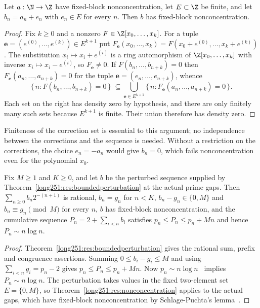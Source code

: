\begin{theorem}\label{long251:res:nonconcentration}
Let $a:\N\to\Z$ have fixed-block nonconcentration, let $E\subset\Z$ be finite,
and let $b_n=a_n+e_n$ with $e_n\in E$ for every $n$.  Then $b$ has fixed-block
nonconcentration.
\end{theorem}

\begin{proof}
Fix $k\ge0$ and a nonzero $F\in\Z[x_0,\ldots,x_k]$.  For a tuple
$\mathbf e=(e^{(0)},\ldots,e^{(k)})\in E^{k+1}$ put
$F_{\mathbf e}(x_0,\ldots,x_k)=F(x_0+e^{(0)},\ldots,x_k+e^{(k)})$.  The
substitution $x_i\mapsto x_i+e^{(i)}$ is a ring automorphism of
$\Z[x_0,\ldots,x_k]$ with inverse $x_i\mapsto x_i-e^{(i)}$, so
$F_{\mathbf e}\ne0$.  If $F(b_n,\ldots,b_{n+k})=0$ then
$F_{\mathbf e}(a_n,\ldots,a_{n+k})=0$ for the tuple
$\mathbf e=(e_n,\ldots,e_{n+k})$, whence
\[
 \{\,n:F(b_n,\ldots,b_{n+k})=0\,\}
 \;\subseteq\!\!
 \bigcup_{\mathbf e\in E^{k+1}}\!\!
 \{\,n:F_{\mathbf e}(a_n,\ldots,a_{n+k})=0\,\}.
\]
Each set on the right has density zero by hypothesis, and there are
only finitely many such sets because $E^{k+1}$ is finite.  Their union
therefore has density zero.
\end{proof}

Finiteness of the correction set is essential to this argument; no
independence between the corrections and the sequence is needed.
Without a restriction on the corrections, the choice $e_n=-a_n$ would
give $b_n=0$, which fails nonconcentration even for the polynomial $x_0$.

\begin{corollary}\label{long251:res:nonconc-primes}
Fix $M\ge1$ and $K\ge0$, and let $b$ be the perturbed sequence supplied by
Theorem~\ref{long251:res:boundedperturbation} at the actual prime gaps.  Then
$\sum_{n\ge0}b_n2^{-(n+1)}$ is rational, $b_n=g_n$ for $n<K$,
$b_n-g_n\in\{0,M\}$ and $b_n\equiv g_n\pmod M$ for every $n$, $b$ has
fixed-block nonconcentration, and the cumulative sequence
$P_n=2+\sum_{i<n}b_i$ satisfies $p_n\le P_n\le p_n+Mn$ and hence
$P_n\sim n\log n$.
\end{corollary}


\begin{proof}
Theorem~\ref{long251:res:boundedperturbation} gives the rational sum,
prefix and congruence assertions.  Summing $0\le b_i-g_i\le M$ and using
$\sum_{i<n}g_i=p_n-2$ gives $p_n\le P_n\le p_n+Mn$.
Now $p_n\sim n\log n$~\cite[Chapter~6]{mv2007} implies $P_n\sim n\log n$.
The perturbation takes values in
the fixed two-element set $E=\{0,M\}$, so
Theorem~\ref{long251:res:nonconcentration} applies to the actual gaps, which
have fixed-block nonconcentration by Schlage-Puchta's
lemma~\cite[Lemma~4]{schlagepuchta2011}.
\end{proof}

